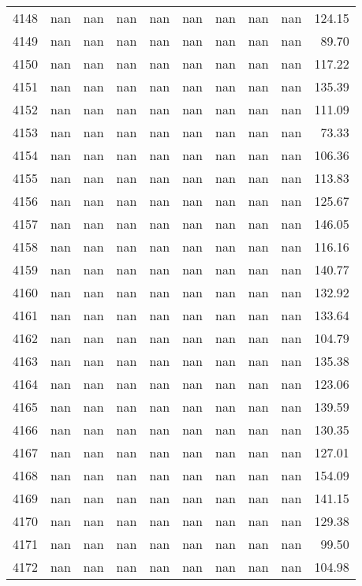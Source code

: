\begin{tabular}{lrrrrrrrrr}
4148 & nan & nan & nan & nan & nan & nan & nan & nan & 124.15 \\
4149 & nan & nan & nan & nan & nan & nan & nan & nan & 89.70 \\
4150 & nan & nan & nan & nan & nan & nan & nan & nan & 117.22 \\
4151 & nan & nan & nan & nan & nan & nan & nan & nan & 135.39 \\
4152 & nan & nan & nan & nan & nan & nan & nan & nan & 111.09 \\
4153 & nan & nan & nan & nan & nan & nan & nan & nan & 73.33 \\
4154 & nan & nan & nan & nan & nan & nan & nan & nan & 106.36 \\
4155 & nan & nan & nan & nan & nan & nan & nan & nan & 113.83 \\
4156 & nan & nan & nan & nan & nan & nan & nan & nan & 125.67 \\
4157 & nan & nan & nan & nan & nan & nan & nan & nan & 146.05 \\
4158 & nan & nan & nan & nan & nan & nan & nan & nan & 116.16 \\
4159 & nan & nan & nan & nan & nan & nan & nan & nan & 140.77 \\
4160 & nan & nan & nan & nan & nan & nan & nan & nan & 132.92 \\
4161 & nan & nan & nan & nan & nan & nan & nan & nan & 133.64 \\
4162 & nan & nan & nan & nan & nan & nan & nan & nan & 104.79 \\
4163 & nan & nan & nan & nan & nan & nan & nan & nan & 135.38 \\
4164 & nan & nan & nan & nan & nan & nan & nan & nan & 123.06 \\
4165 & nan & nan & nan & nan & nan & nan & nan & nan & 139.59 \\
4166 & nan & nan & nan & nan & nan & nan & nan & nan & 130.35 \\
4167 & nan & nan & nan & nan & nan & nan & nan & nan & 127.01 \\
4168 & nan & nan & nan & nan & nan & nan & nan & nan & 154.09 \\
4169 & nan & nan & nan & nan & nan & nan & nan & nan & 141.15 \\
4170 & nan & nan & nan & nan & nan & nan & nan & nan & 129.38 \\
4171 & nan & nan & nan & nan & nan & nan & nan & nan & 99.50 \\
4172 & nan & nan & nan & nan & nan & nan & nan & nan & 104.98 \\

\end{tabular}
